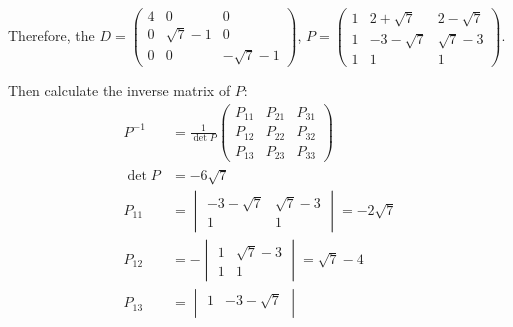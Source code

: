 \documentclass[letterpaper, 11pt]{article}
\newcommand{\1}{\mathds{1}}	%
\theoremstyle{definition}
\begin{document}
Therefore, the $D = \begin{pmatrix}
    4 & 0          & 0           \\
    0 & \sqrt{7}-1 & 0           \\
    0 & 0          & -\sqrt{7}-1
  \end{pmatrix}$, $P = \begin{pmatrix}
    1 & 2+\sqrt{7}  & 2-\sqrt{7} \\
    1 & -3-\sqrt{7} & \sqrt{7}-3 \\
    1 & 1           & 1
  \end{pmatrix}$.

Then calculate the inverse matrix of $P$:
\begin{align*}
  P ^{-1} & = \frac{1}{\det P} \begin{pmatrix}
                                 P_{11} & P_{21} & P_{31} \\
                                 P_{12} & P_{22} & P_{32} \\
                                 P_{13} & P_{23} & P_{33}
                               \end{pmatrix}                                                                                                                             \\
  \det P  & = -6 \sqrt{7}                                                                                                                                                           \\
  P_{11}  & = \begin{vmatrix}
                -3-\sqrt{7} & \sqrt{7}-3 \\
                1           & 1
              \end{vmatrix} = -2 \sqrt{7}                                                                                                                                           \\
  P_{12}  & = -\begin{vmatrix}
                 1 & \sqrt{7} -3 \\
                 1 & 1
               \end{vmatrix} = \sqrt{7} - 4                                                                                                                                         \\
  P_{13}  & = \begin{vmatrix}
                1 & -3-\sqrt{7} \\

\end{vmatrix}
\end{align*}
\end{document}
